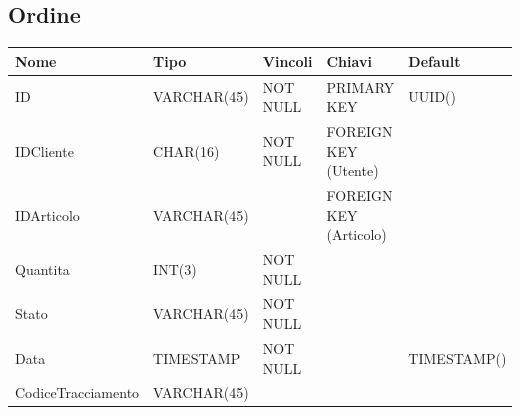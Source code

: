 \documentclass[12pt,a4paper]{article}
\begin{document}
\subsection{Ordine}
\begin{center}
\begin{tabular}{|l|l|l|l|l|}
\hline
\rowcolor[HTML]{C0C0C0} 
\textbf{Nome} & \textbf{Tipo} & \textbf{Vincoli} & \textbf{Chiavi} & \textbf{Default}  \\ \hline
ID & VARCHAR(45) & NOT NULL & PRIMARY KEY & UUID() \\ \hline
IDCliente & CHAR(16) & NOT NULL & FOREIGN KEY (Utente)& \\ \hline
IDArticolo & VARCHAR(45) & & FOREIGN KEY (Articolo)& \\ \hline
Quantita & INT(3) & NOT NULL & & \\ \hline
Stato & VARCHAR(45) & NOT NULL & & \\ \hline
Data & TIMESTAMP & NOT NULL & & TIMESTAMP() \\ \hline
CodiceTracciamento & VARCHAR(45) & & \\ \hline
\end{tabular}
\end{center}
\end{document}
